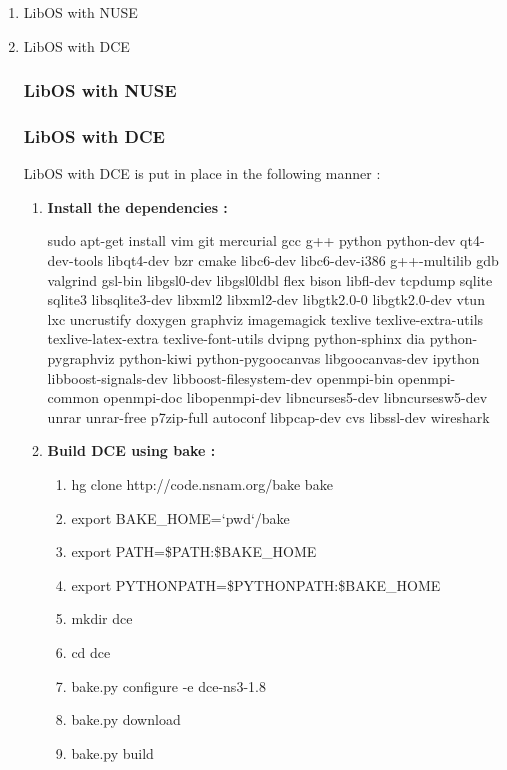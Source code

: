 \documentclass[a4paper,11pt]{article}
\begin{document}
			\begin{enumerate}

				\item LibOS with NUSE
				\item LibOS with DCE

				\subsubsection{LibOS with NUSE}
					\label{subsubsec:liboswithnuse}

				\subsubsection{LibOS with DCE}
					\label{subsubsec:liboswithdce}

					LibOS with DCE is put in place in the following manner :

					\begin{enumerate}

					\item \textbf{Install the dependencies :}
						
					\nohyphens{
						sudo apt-get install vim git mercurial gcc g++ python python-dev qt4-dev-tools libqt4-dev bzr cmake libc6-dev libc6-dev-i386 g++-multilib gdb valgrind gsl-bin libgsl0-dev libgsl0ldbl flex bison libfl-dev tcpdump sqlite sqlite3 libsqlite3-dev libxml2 libxml2-dev libgtk2.0-0 libgtk2.0-dev vtun lxc uncrustify doxygen graphviz imagemagick texlive texlive-extra-utils texlive-latex-extra texlive-font-utils dvipng python-sphinx dia python-pygraphviz python-kiwi python-pygoocanvas libgoocanvas-dev ipython libboost-signals-dev libboost-filesystem-dev openmpi-bin openmpi-common openmpi-doc libopenmpi-dev libncurses5-dev libncursesw5-dev unrar unrar-free p7zip-full autoconf libpcap-dev cvs libssl-dev wireshark}

					\item \textbf{Build DCE using bake :}

						\begin{enumerate}

							\item hg clone http://code.nsnam.org/bake bake
							\item export BAKE\_HOME=`pwd`/bake
							\item export PATH=\$PATH:\$BAKE\_HOME
							\item export PYTHONPATH=\$PYTHONPATH:\$BAKE\_HOME
							\item mkdir dce
							\item cd dce
							\item bake.py configure -e dce-ns3-1.8
							\item bake.py download
							\item bake.py build


\end{enumerate}
\end{enumerate}
\end{enumerate}
\end{document}
